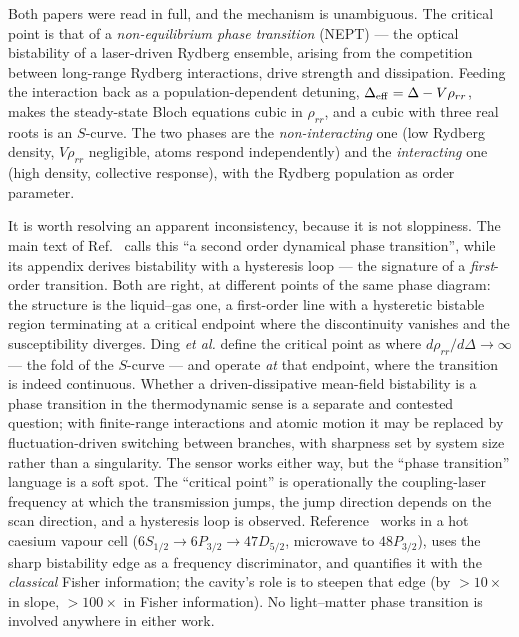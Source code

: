 \documentclass[11pt,a4paper]{article}
\begin{document}
Both papers were read in full, and the mechanism is unambiguous. The critical point is that
of a \emph{non-equilibrium phase transition} (NEPT) --- the optical bistability of a
laser-driven Rydberg ensemble, arising from the competition between long-range Rydberg
interactions, drive strength and dissipation. Feeding the interaction back as a
population-dependent detuning, $\Delta_{\rm eff}=\Delta-V\rho_{rr}$, makes the steady-state
Bloch equations cubic in $\rho_{rr}$, and a cubic with three real roots is an $S$-curve. The
two phases are the \emph{non-interacting} one (low Rydberg density, $V\rho_{rr}$ negligible,
atoms respond independently) and the \emph{interacting} one (high density, collective
response), with the Rydberg population as order parameter.

It is worth resolving an apparent inconsistency, because it is not sloppiness. The main text
of Ref.~\cite{Ding2022} calls this ``a second order dynamical phase transition'', while its
appendix derives bistability with a hysteresis loop --- the signature of a \emph{first}-order
transition. Both are right, at different points of the same phase diagram: the structure is
the liquid--gas one, a first-order line with a hysteretic bistable region terminating at a
critical endpoint where the discontinuity vanishes and the susceptibility diverges. Ding
\emph{et al.} define the critical point as where $d\rho_{rr}/d\Delta\to\infty$ --- the fold of
the $S$-curve --- and operate \emph{at} that endpoint, where the transition is indeed
continuous. Whether a driven-dissipative mean-field bistability is a phase transition in the
thermodynamic sense is a separate and contested question; with finite-range interactions and
atomic motion it may be replaced by fluctuation-driven switching between branches, with
sharpness set by system size rather than a singularity. The sensor works either way, but the
``phase transition'' language is a soft spot. The ``critical point'' is operationally the
coupling-laser frequency at which the transmission jumps, the jump direction depends on the
scan direction, and a hysteresis loop is observed. Reference~\cite{Wang2025} works in a hot
caesium vapour cell ($6S_{1/2}\!\to\!6P_{3/2}\!\to\!47D_{5/2}$, microwave to $48P_{3/2}$),
uses the sharp bistability edge as a frequency discriminator, and quantifies it with the
\emph{classical} Fisher information; the cavity's role is to steepen that edge (by
$>10\times$ in slope, $>100\times$ in Fisher information). No light--matter phase transition
is involved anywhere in either work.
\end{document}
